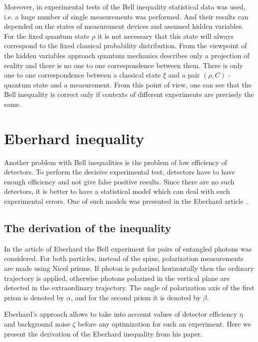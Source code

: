 \documentclass[%
master,         %
subf,           %
href,           %
colorlinks=true %
]{disser}
\numberwithin{equation}{section}
\numberwithin{figure}{section}
\begin{document}
Moreover, in experimental tests of the Bell inequality statistical data was used, i.e. a huge number of single measurements was performed. And their results can depended on the states of measurement devices and assumed hidden variables. For the fixed quantum state $\rho$ it is not necessary that this state will always correspond to the fixed classical probability distribution. From the viewpoint of the hidden variables approach quantum mechanics describes only a projection of reality and there is no one to one correspondence between them. There is only one to one correspondence between a classical state $\xi$ and a pair $(\rho, C)$ - quantum state and a measurement. From this point of view, one can see that the Bell inequality is correct only if contexts of different experiments are precisely the same.

\section{Eberhard inequality}
Another problem with Bell inequalities is the problem of low efficiency of detectors. To perform the decisive experimental test, detectors have to have enough efficiency and not give false positive results. Since there are no such detectors, it is better to have a statistical model which can deal with such experimental errors. One of such models was presented in the Eberhard article \cite{Eberhard}.


\subsection{The derivation of the inequality}
In the article of Eberhard \cite{Eberhard} the Bell experiment for pairs of entangled photons was considered. For both particles, instead of the spins, polarization measurements are made using Nicol prisms. If photon is polarized horizontally then the ordinary trajectory is applied, otherwise photons polarized in the vertical plane are detected in the extraordinary trajectory. The angle of polarization axis of the first prism is denoted by $\alpha$, and for the second prism it is denoted by $\beta$.

Eberhard's approach allows to take into account values of detector efficiency $\eta$ and background noise $\zeta$ before any optimization for such an experiment. Here we present the derivation of the Eberhard inequality from his paper. 

\end{document}
